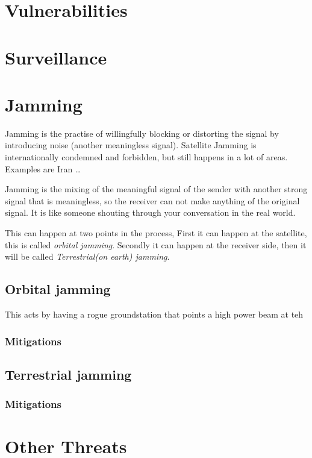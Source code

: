\section{Vulnerabilities}
\label{vulnerabilities}

\section{Surveillance}
\label{surveillance}

\section{Jamming}
\label{jamming}

Jamming is the practise of willingfully blocking or distorting the signal by introducing noise (another meaningless signal). Satellite Jamming is internationally condemned and forbidden, but still happens in a lot of areas. Examples are Iran {\ldots}

Jamming is the mixing of the meaningful signal of the sender with another strong signal that is meaningless, so the receiver can not make anything of the original signal. It is like someone shouting through your conversation in the real world.

This can happen at two points in the process, First it can happen at the satellite, this is called \emph{orbital jamming}. Secondly it can happen at the receiver side, then it will be called \emph{Terrestrial(on earth) jamming}.

\subsection{Orbital jamming}
\label{orbitaljamming}

This acts by having a rogue groundstation that points a high power beam at teh 

\subsubsection{Mitigations}
\label{mitigations}

\subsection{Terrestrial jamming}
\label{terrestrialjamming}

\subsubsection{Mitigations}
\label{mitigations}

\section{Other Threats}
\label{otherthreats}
